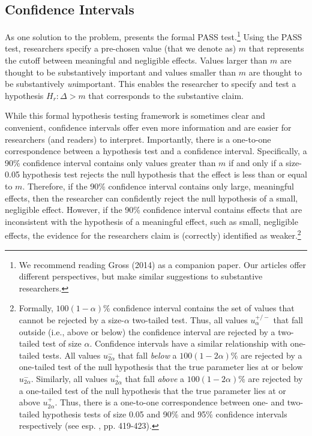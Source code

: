 \documentclass[12pt]{article}
\begin{document}
\subsection*{Confidence Intervals}

As one solution to the problem, \cite{Gross2014} presents the formal PASS test.\footnote{We recommend reading Gross (2014) as a companion paper. Our articles offer different perspectives, but make similar suggestions to substantive researchers.} Using the PASS test, researchers specify a pre-chosen value (that we denote as) $m$ that represents the cutoff between meaningful and negligible effects. Values larger than $m$ are thought to be substantively important and values smaller than $m$ are thought to be substantively \textit{un}important. This enables the researcher to specify and test a hypothesis $H_r: \Delta > m$ that corresponds to the substantive claim.

While this formal hypothesis testing framework is sometimes clear and convenient, confidence intervals offer even more information and are easier for researchers (and readers) to interpret. Importantly, there is a one-to-one correspondence between a hypothesis test and a confidence interval. Specifically, a 90\% confidence interval contains only values greater than $m$ if and only if a size-0.05 hypothesis test rejects the null hypothesis that the effect is less than or equal to $m$. Therefore, if the 90\% confidence interval contains only large, meaningful effects, then the researcher can confidently reject the null hypothesis of a small, negligible effect. However, if the 90\% confidence interval contains effects that are inconsistent with the hypothesis of a meaningful effect, such as small, negligible effects, the evidence for the researchers claim is (correctly) identified as weaker.\footnote{
Formally, $100(1-\alpha)$\% confidence interval contains the set of values that cannot be rejected by a size-$\alpha$ two-tailed test. Thus, all values $u^{+/-}_{\alpha}$ that fall outside (i.e., above or below) the confidence interval are rejected by a two-tailed test of size $\alpha$. Confidence intervals have a similar relationship with one-tailed tests. All values $u^{-}_{2\alpha}$ that fall \textit{below} a $100(1-2\alpha)$\% are rejected by a one-tailed test of the null hypothesis that the true parameter lies at or below $u^{-}_{2\alpha}$. Similarly, all values $u^{+}_{2\alpha}$ that fall \textit{above} a $100(1-2\alpha)$\% are rejected by a one-tailed test of the null hypothesis that the true parameter lies at or above $u^{+}_{2\alpha}$. Thus, there is a one-to-one correspondence between one- and two-tailed hypothesis tests of size 0.05 and 90\% and 95\% confidence intervals respectively (see esp. \citealt{CasellaBerger2002}, pp. 419-423).
}
\end{document}
